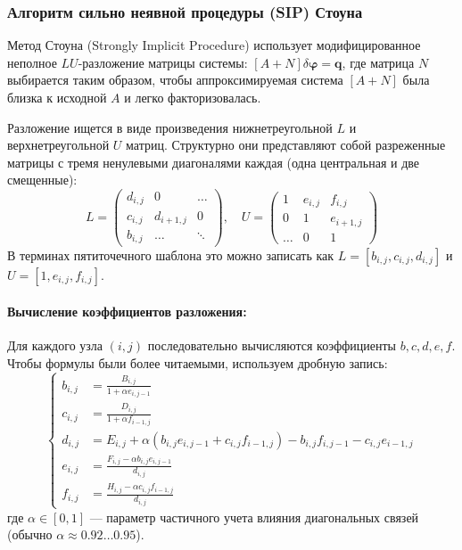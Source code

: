 \documentclass[a4paper,12pt]{article}
\begin{document}
	
	\subsubsection{Алгоритм сильно неявной процедуры (SIP) Стоуна}
	
	Метод Стоуна \cite{stone1968} (Strongly Implicit Procedure) использует модифицированное неполное $LU$-разложение матрицы системы: $[A+N] \delta \boldsymbol{\varphi} = \mathbf{q}$, где матрица $N$ выбирается таким образом, чтобы аппроксимируемая система $[A+N]$ была близка к исходной $A$ и легко факторизовалась.
	
	Разложение ищется в виде произведения нижнетреугольной $L$ и верхнетреугольной $U$ матриц. Структурно они представляют собой разреженные матрицы с тремя ненулевыми диагоналями каждая (одна центральная и две смещенные):
	\[
	L = \begin{pmatrix}
		d_{i,j} & 0 & \dots \\
		c_{i,j} & d_{i+1,j} & 0 \\
		b_{i,j} & \dots & \ddots
	\end{pmatrix}, \quad
	U = \begin{pmatrix}
		1 & e_{i,j} & f_{i,j} \\
		0 & 1 & e_{i+1,j} \\
		\dots & 0 & 1
	\end{pmatrix}
	\]
	В терминах пятиточечного шаблона это можно записать как $L = [b_{i,j}, c_{i,j}, d_{i,j}]$ и $U = [1, e_{i,j}, f_{i,j}]$.

	\paragraph{Вычисление коэффициентов разложения:}
	Для каждого узла $(i,j)$ последовательно вычисляются коэффициенты $b, c, d, e, f$. Чтобы формулы были более читаемыми, используем дробную запись:
	\begin{equation}
		\displaystyle
		\left\{
		\begin{aligned}
			b_{i,j} &= \frac{B_{i,j}}{1 + \alpha e_{i,j-1}} \\[10pt]
			c_{i,j} &= \frac{D_{i,j}}{1 + \alpha f_{i-1,j}} \\[10pt]
			d_{i,j} &= E_{i,j} + \alpha (b_{i,j} e_{i,j-1} + c_{i,j} f_{i-1,j}) - b_{i,j} f_{i,j-1} - c_{i,j} e_{i-1,j} \\[10pt]
			e_{i,j} &= \frac{F_{i,j} - \alpha b_{i,j} e_{i,j-1}}{d_{i,j}} \\[10pt]
			f_{i,j} &= \frac{H_{i,j} - \alpha c_{i,j} f_{i-1,j}}{d_{i,j}}
		\end{aligned}
		\right.
	\end{equation}
	где $\alpha \in [0, 1]$ — параметр частичного учета влияния диагональных связей (обычно $\alpha \approx 0.92 \dots 0.95$).
	
\end{document}
